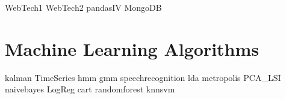 \documentclass[nociteref]{SIAM-GH-book}
\begin{document}
{WebTech1}
{WebTech2}
{pandasIV}
{MongoDB}

\part{Machine Learning Algorithms}
{kalman}
{TimeSeries}
{hmm}
{gmm}
{speechrecognition}
{lda}
{metropolis}
{PCA_LSI}
{naivebayes}
{LogReg}
{cart}
{randomforest}
{knnsvm}
\end{document}
